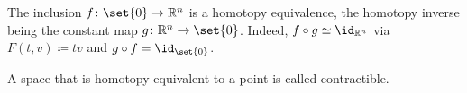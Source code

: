 The inclusion $f\colon \set{0}\to \mathbb{R}^n$ is a homotopy equivalence, the homotopy
inverse being the constant map $g\colon \mathbb{R}^n\to \set{0}$. Indeed,
$f \circ g\simeq \id_{\mathbb{R}^n}$ via $F(t, v)\coloneqq tv$ and
 $g \circ f = \id_{\set{0}}$.

A space that is homotopy equivalent to a point is called contractible.
